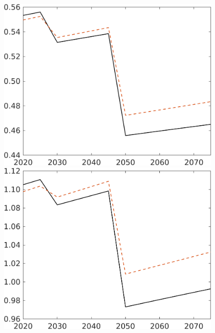 \begin{figure}

\begin{minipage}[]{0.32\textwidth}
	\includegraphics[width=1\textwidth]{../../codding_model/own_basedOnFried/optimalPol_elastS_DisuSci/figures/all_1705/comp_notaul_OPT_T_NoTaus_E_spillover0_sep1_BN0_ineq0_etaa0.79.png}
\end{minipage}
\begin{minipage}[]{0.32\textwidth}
	\includegraphics[width=1\textwidth]{../../codding_model/own_basedOnFried/optimalPol_elastS_DisuSci/figures/all_1705/comp_notaul_OPT_T_NoTaus_Y_spillover0_sep1_BN0_ineq0_etaa0.79.png}
\end{minipage}
\end{figure}

